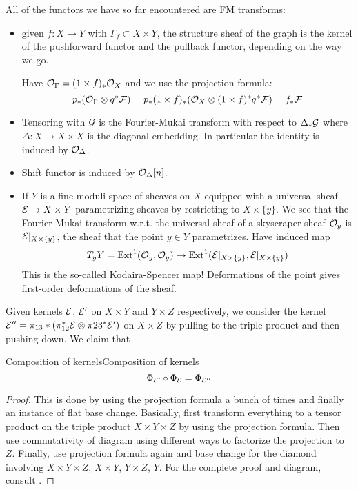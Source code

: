 All of the functors we have so far encountered are FM transforms:
\begin{itemize}
    \item given $f:X\to Y$ with $\Gamma_f\subset X\times Y$, the structure sheaf of the graph is the kernel of the pushforward functor and the pullback functor, depending on the way we go.

    Have $\mathcal{O}_\Gamma=(1\times f)_*\mathcal{O}_X$ and we use the projection formula:
    \begin{equation*}
        p_*(\mathcal{O}_\Gamma\otimes q^*\mathcal{F})
            = p_*(1\times f)_*(\mathcal{O}_X\otimes(1\times f)^*q^*\mathcal{F})
            = f_*\mathcal{F}
    \end{equation*}

    \item Tensoring with $\mathcal{G}$ is the Fourier-Mukai transform with respect to $\Delta_*\mathcal{G}$ where $\Delta:X\to X\times X$ is the diagonal embedding. In particular the identity is induced by $\mathcal{O}_\Delta$.

    \item Shift functor is induced by $\mathcal{O}_\Delta[n]$.

    \item If $Y$ is a fine moduli space of sheaves on $X$ equipped with a universal sheaf $\mathcal{E}\to X\times Y$ parametrizing sheaves by restricting to $X\times\{y\}$. We see that the Fourier-Mukai transform w.r.t. the universal sheaf of a skyscraper sheaf $\mathcal{O}_y$ is $\mathcal{E}|_{X\times\{y\}}$, the sheaf that the point $y\in Y$ parametrizes. Have induced map
        \begin{equation*}
            T_yY
                = \operatorname{Ext}^1(\mathcal{O}_{y},\mathcal{O}_{y})
                \to \operatorname{Ext}^1(\mathcal{E}|_{X\times\{y\}},\mathcal{E}|_{X\times\{y\}})
        \end{equation*}
        This is the so-called Kodaira-Spencer map! Deformations of the point gives first-order deformations of the sheaf.
\end{itemize}

Given kernels $\mathcal{E}$, $\mathcal{E}'$ on $X\times Y$ and $Y\times Z$ respectively, we consider the kernel $\mathcal{E}''=\pi_{13}*(\pi_{12}^*\mathcal{E}\otimes\pi{23}^*\mathcal{E}')$ on $X\times Z$ by pulling to the triple product and then pushing down. We claim that
\begin{proposition}{Composition of kernels}{Composition of kernels}
\begin{equation*}
    \Phi_{\mathcal{E}'}\circ\Phi_{\mathcal{E}} = \Phi_{\mathcal{E}''}
\end{equation*}
\end{proposition}
\begin{proof}
    This is done by using the projection formula a bunch of times and finally an instance of flat base change. Basically, first transform everything to a tensor product on the triple product $X\times Y \times Z$ by using the projection formula. Then use commutativity of diagram using different ways to factorize the projection to $Z$. Finally, use projection formula again and base change for the diamond involving $X\times Y \times Z$, $X\times Y$, $Y\times Z$, $Y$. For the complete proof and diagram, consult \cite[\S5][Proposition~5.10]{Huybrechts}.
\end{proof}

